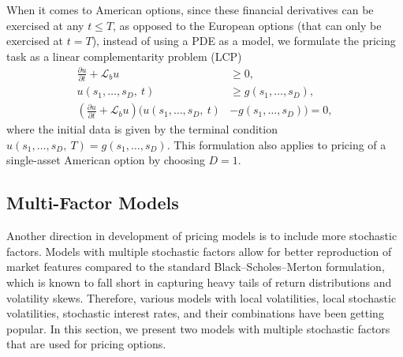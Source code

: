 \documentclass{UUThesisTemplate}
\begin{document}
\par
When it comes to American options, since these financial derivatives can be exercised at any $t \leq T$, as opposed to the European options (that can only be exercised at $t=T$), instead of using a PDE as a model, we formulate the pricing task as a linear complementarity problem (LCP)
\begin{align}
\frac{\partial u}{\partial t}+\mathcal{L}_b u&\geq 0,\nonumber \\
u(s_1,\ldots, s_D,\ t)&\geq g(s_1,\ldots, s_D), \nonumber \\
\left( \frac{\partial u}{\partial t}+\mathcal{L}_b u\right) \big(u(s_1,\ldots, s_D,\ t) &-g(s_1,\ldots, s_D)\big)=0, \label{eqlcp}
\end{align}
where the initial data is given by the terminal condition $u(s_1,\ldots,s_D,\ T)=g(s_1,\ldots,s_D)$. This formulation also applies to pricing of a single-asset American option by choosing $D=1$. 
%



%
\subsection{Multi-Factor Models}
\label{sub:multifactor}

\par
Another direction in development of pricing models is to include more stochastic factors. Models with multiple stochastic factors allow for better reproduction of market features compared to the standard Black--Scholes--Merton formulation, which is known to fall short in capturing heavy tails of return distributions and volatility skews. Therefore, various models with local volatilities, local stochastic volatilities, stochastic interest rates, and their combinations have been getting popular. In this section, we present two models with multiple stochastic factors that are used for pricing options.
\end{document}
